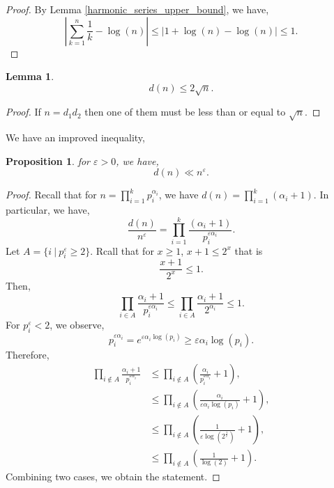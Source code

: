 \documentclass{article}
\newtheorem{proposition}{Proposition}[section]
\newtheorem{lemma}{Lemma}[section]
\newcommand{\sep}[0]{\:|\:}
\begin{document}
\begin{proof}
  By Lemma \ref{harmonic_series_upper_bound}, we have,
  \begin{equation*}
    \left\vert\sum_{k=1}^n{\frac 1 k} - \log(n)\right\vert \leq \left\vert1+\log(n) - \log(n)\right\vert \leq 1.
  \end{equation*}
\end{proof}

\begin{lemma}
  \begin{equation*}
    d(n)\leq 2\sqrt{n}.
  \end{equation*}
\end{lemma}

\begin{proof}
  If $n = d_1d_2$ then one of them must be less than or equal to $\sqrt{n}$.
\end{proof}

We have an improved inequality,
\begin{proposition}
  for $\varepsilon>0$, we have,
  \begin{equation*}
    d(n)\ll  n^\varepsilon.
  \end{equation*}
\end{proposition}

\begin{proof}
  Recall that for $n = \prod_{i=1}^k p_i^{\alpha_i}$, we have $d(n) = \prod_{i=1}^k(\alpha_i+1)$. In particular, we have,
  \begin{equation*}
    {\frac {d(n)} {n^\varepsilon}} = \prod_{i=1}^k {\frac {(\alpha_i+1)} {p_i^{\varepsilon\alpha_i}}}.
  \end{equation*}
  Let $A = \{i\sep p_i^\varepsilon\geq2\}$. Rcall that for $x\geq1$, $x+1\leq 2^x$ that is 
  \begin{equation*}
    {\frac {x+1} {2^x}}\leq 1.
  \end{equation*}
  Then,
  \begin{equation*}
    \prod_{i\in A}{\frac {\alpha_i+1} {p_i^{\varepsilon\alpha_i}}} \leq\prod_{i\in A} {\frac {\alpha_i+1} {2^{\alpha_i}}}\leq 1.
  \end{equation*}
  For $p_i^\varepsilon<2$, we observe,
  \begin{equation*}
    p_i^{\varepsilon\alpha_i}=e^{\varepsilon \alpha_i\log(p_i)}\geq \varepsilon\alpha_i\log(p_i).
  \end{equation*}
  Therefore,
  \begin{align*}
    \prod_{i\not\in A}{\frac {\alpha_i+1} {p_i^{\varepsilon\alpha_i}}}&\leq \prod_{i\not\in A}\left({\frac {\alpha_i} {p_i^{\varepsilon\alpha_i}}}+1\right),\\
    & \leq \prod_{i\not\in A}\left({\frac {\alpha_i} {\varepsilon\alpha_i\log(p_i)}}+1\right),\\
    &\leq \prod_{i\not\in A}\left({\frac 1 {\varepsilon\log(2^{{\frac 1 \varepsilon}})}}+1\right),\\
    & \leq \prod_{i\not\in A}\left({\frac 1 {\log(2)}}+1\right).
  \end{align*}
  Combining two cases, we obtain the statement.
\end{proof}
\end{document}
